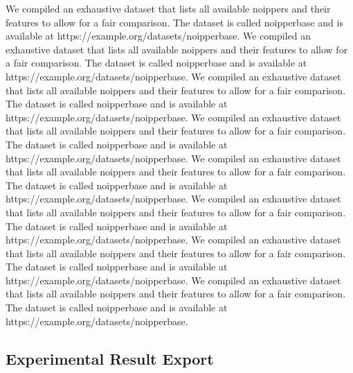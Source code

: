 We compiled an exhaustive dataset that lists all available noippers and their features to allow for a fair comparison. The dataset is called noipperbase and is available at https://example.org/datasets/noipperbase.
We compiled an exhaustive dataset that lists all available noippers and their features to allow for a fair comparison. The dataset is called noipperbase and is available at https://example.org/datasets/noipperbase.
We compiled an exhaustive dataset that lists all available noippers and their features to allow for a fair comparison. The dataset is called noipperbase and is available at https://example.org/datasets/noipperbase.
We compiled an exhaustive dataset that lists all available noippers and their features to allow for a fair comparison. The dataset is called noipperbase and is available at https://example.org/datasets/noipperbase.
We compiled an exhaustive dataset that lists all available noippers and their features to allow for a fair comparison. The dataset is called noipperbase and is available at https://example.org/datasets/noipperbase.
We compiled an exhaustive dataset that lists all available noippers and their features to allow for a fair comparison. The dataset is called noipperbase and is available at https://example.org/datasets/noipperbase.
We compiled an exhaustive dataset that lists all available noippers and their features to allow for a fair comparison. The dataset is called noipperbase and is available at https://example.org/datasets/noipperbase.
We compiled an exhaustive dataset that lists all available noippers and their features to allow for a fair comparison. The dataset is called noipperbase and is available at https://example.org/datasets/noipperbase.

\subsection{Experimental Result Export}


